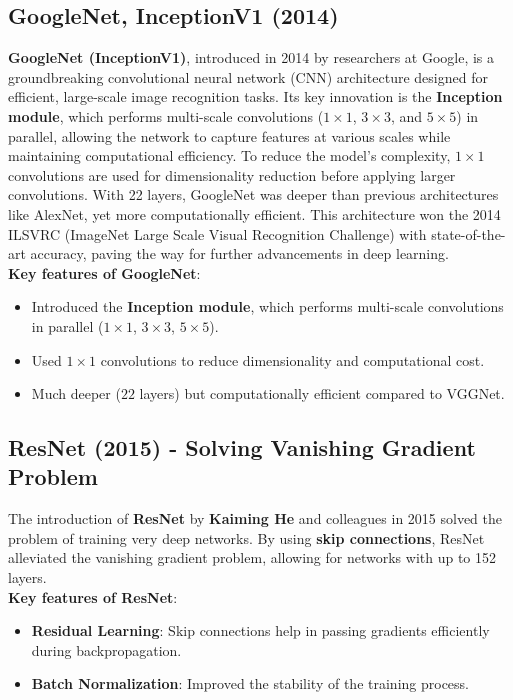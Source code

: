 \subsection{GoogleNet, InceptionV1 (2014)}
\textbf{GoogleNet (InceptionV1)}, introduced in 2014 by researchers at Google, is a groundbreaking convolutional neural network (CNN) architecture designed for efficient, large-scale image recognition tasks. Its key innovation is the \textbf{Inception module}, which performs multi-scale convolutions ($1 \times1$, $3 \times3$, and $5 \times5$) in parallel, allowing the network to capture features at various scales while maintaining computational efficiency. To reduce the model's complexity, $1 \times1$ convolutions are used for dimensionality reduction before applying larger convolutions. With 22 layers, GoogleNet was deeper than previous architectures like AlexNet, yet more computationally efficient. This architecture won the 2014 ILSVRC (ImageNet Large Scale Visual Recognition Challenge) with state-of-the-art accuracy, paving the way for further advancements in deep learning.\cite{szegedy2015googlenet}\\

\textbf{Key features of GoogleNet}:
\begin{itemize}
    \item Introduced the \textbf{Inception module}, which performs multi-scale convolutions in parallel ($1 \times1$, $3 \times3$, $5 \times5$).
    \item Used $1 \times1$ convolutions to reduce dimensionality and computational cost.
    \item Much deeper ($22$ layers) but computationally efficient compared to VGGNet.
\end{itemize}

\subsection{ResNet (2015) - Solving Vanishing Gradient Problem}
The introduction of \textbf{ResNet} by \textbf{Kaiming He} and colleagues in 2015 solved the problem of training very deep networks. By using \textbf{skip connections}, ResNet alleviated the vanishing gradient problem, allowing for networks with up to 152 layers.\cite{he2015deep}\\

\textbf{Key features of ResNet}:
\begin{itemize}
    \item \textbf{Residual Learning}: Skip connections help in passing gradients efficiently during backpropagation.
    \item \textbf{Batch Normalization}: Improved the stability of the training process.
\end{itemize}

